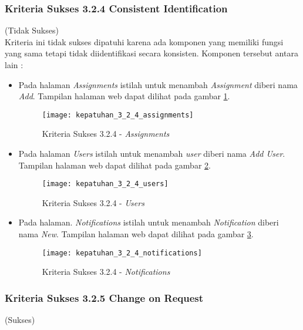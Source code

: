 \subsubsection{Kriteria Sukses 3.2.4 Consistent Identification}
\label{subsubsec:kepatuhan_kriteria_3.2.4}
(Tidak Sukses) \\

Kriteria ini tidak sukses dipatuhi karena ada komponen yang memiliki fungsi yang sama tetapi tidak diidentifikasi secara konsisten. Komponen tersebut antara lain :

\begin{itemize}
	\item Pada halaman \textit{Assignments} istilah untuk menambah \textit{Assignment} diberi nama \textit{Add}. Tampilan halaman web dapat dilihat pada gambar \ref{fig:kepatuhan_3_2_4_assignments}.
	\begin{figure}[H]
		\centering  
		\texttt{[image: kepatuhan\_3\_2\_4\_assignments]}  
		\caption[Kriteria Sukses 3.2.4 - \textit{Assignments}]{Kriteria Sukses 3.2.4 - \textit{Assignments}} 
		\label{fig:kepatuhan_3_2_4_assignments} 
	\end{figure}

	\item Pada halaman \textit{Users} istilah untuk menambah \textit{user} diberi nama \textit{Add User}. Tampilan halaman web dapat dilihat pada gambar \ref{fig:kepatuhan_3_2_4_users}.
	\begin{figure}[H]
		\centering  
		\texttt{[image: kepatuhan\_3\_2\_4\_users]}  
		\caption[Kriteria Sukses 3.2.4 - \textit{Users}]{Kriteria Sukses 3.2.4 - \textit{Users}} 
		\label{fig:kepatuhan_3_2_4_users} 
	\end{figure}

	\item Pada halaman. \textit{Notifications} istilah untuk menambah \textit{Notification} diberi nama \textit{New}. Tampilan halaman web dapat dilihat pada gambar \ref{fig:kepatuhan_3_2_4_notifications}.
	\begin{figure}[H]
		\centering  
		\texttt{[image: kepatuhan\_3\_2\_4\_notifications]}  
		\caption[Kriteria Sukses 3.2.4 - \textit{Notifications}]{Kriteria Sukses 3.2.4 - \textit{Notifications}} 
		\label{fig:kepatuhan_3_2_4_notifications} 
	\end{figure}

\end{itemize}

\subsubsection{Kriteria Sukses 3.2.5 Change on Request}
\label{subsubsec:kepatuhan_kriteria_3.2.5}
(Sukses) \\

